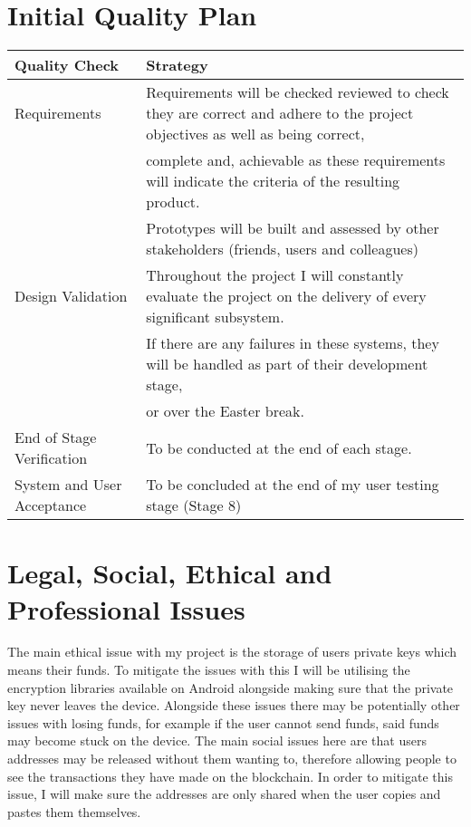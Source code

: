 \documentclass[11pt]{article}
\begin{document}
\section{Initial Quality Plan}
\label{sec:orga463250}
\begin{adjustbox}{width={\textwidth},keepaspectratio}
\centering
\begin{center}
\begin{tabular}{|l|l|}
\hline
Quality Check & Strategy\\
\hline
Requirements & Requirements will be checked reviewed to check they are correct and adhere to the project objectives as well as being correct,\\
 & complete and, achievable as these requirements will indicate the criteria of the resulting product.\\
 & Prototypes will be built and assessed by other stakeholders (friends, users and colleagues)\\
Design Validation & Throughout the project I will constantly evaluate the project on the delivery of every significant subsystem.\\
 & If there are any failures in these systems, they will be handled as part of their development stage,\\
 & or over the Easter break.\\
End of Stage Verification & To be conducted at the end of each stage.\\
System and User Acceptance & To be concluded at the end of my user testing stage (Stage 8)\\
\hline
\end{tabular}
\end{center}
\end{adjustbox}


\section{Legal, Social, Ethical and Professional Issues}
\label{sec:org7c75a59}
The main ethical issue with my project is the storage of users private keys which means their funds.
To mitigate the issues with this I will be utilising the encryption libraries available on Android alongside making sure that the private key never leaves the device.
Alongside these issues there may be potentially other issues with losing funds, for example if the user cannot send funds, said funds may become stuck on the device. 
The main social issues here are that users addresses may be released without them wanting to, therefore allowing people to see the transactions they have made on the blockchain.
In order to mitigate this issue, I will make sure the addresses are only shared when the user copies and pastes them themselves.
\end{document}
